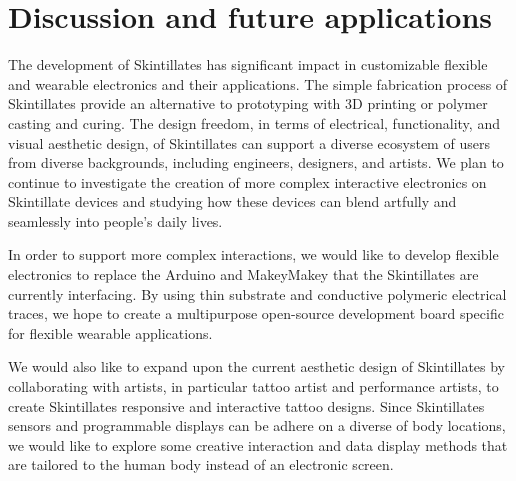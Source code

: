 \documentclass{sigchi}
\begin{document}
\section {Discussion and future applications}
The development of Skintillates has significant impact in customizable flexible and wearable electronics and their applications. The simple fabrication process of Skintillates provide an alternative to prototyping with 3D printing or polymer casting and curing.  The design freedom, in terms of electrical, functionality, and visual aesthetic design, of Skintillates can support a diverse ecosystem of users from diverse backgrounds, including engineers, designers, and artists. We plan to continue to investigate the creation of more complex interactive electronics on Skintillate devices and studying how these devices can blend artfully and seamlessly into people's daily lives. 

In order to support more complex interactions, we would like to develop flexible electronics to replace the Arduino and MakeyMakey that the Skintillates are currently interfacing. By using thin substrate and conductive polymeric electrical traces, we hope to create a multipurpose open-source development board specific for flexible wearable applications. 

We would also like to expand upon the current aesthetic design of Skintillates by collaborating with artists, in particular tattoo artist and performance artists, to create Skintillates responsive and interactive tattoo designs. Since Skintillates sensors and programmable displays can be adhere on a diverse of body locations, we would like to explore some creative interaction and data display methods that are tailored to the human body instead of an electronic screen. 
\end{document}

